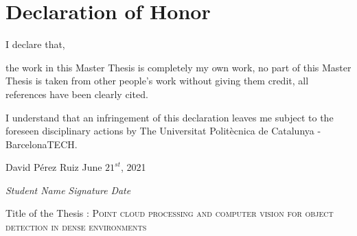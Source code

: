 \documentclass[../main.tex]{subfiles}
\begin{document}
\section*{Declaration of Honor}

\vspace{1em}

I declare that,

\vspace{1em}

the work in this Master Thesis is completely my own work, no part of this Master Thesis is taken from other people’s work without giving them credit, all references have been clearly cited.

\vspace{1em}

I understand that an infringement of this declaration leaves me subject to the foreseen disciplinary actions by The Universitat Politècnica de Catalunya - BarcelonaTECH.

\vspace{6em}

David Pérez Ruiz    \hspace{9cm}     June $21^{st}$, 2021

\vspace{2em}

\textit{Student Name}    \hspace{4.5cm}    \textit{Signature}       \hspace{4.5cm} \textit{Date}

\vspace{10em}

Title of the Thesis : \textsc{\large{Point cloud processing and computer vision for object detection in dense environments}}
\end{document}

